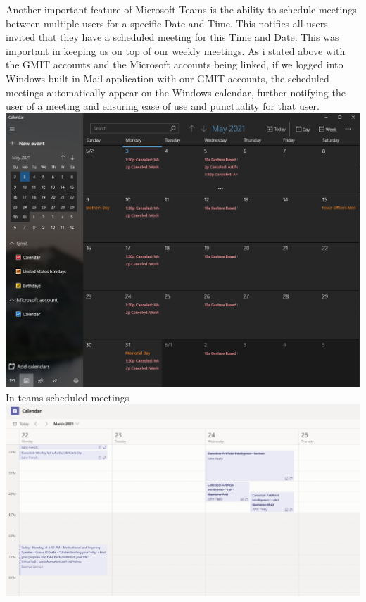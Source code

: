 Another important feature of Microsoft Teams is the ability to schedule meetings between multiple users for a specific Date and Time. This notifies all users invited that they have a scheduled meeting for this Time and Date. This was important in keeping us on top of our weekly meetings. As i stated above with the GMIT accounts and the Microsoft accounts being linked, if we logged into Windows built in Mail application with our GMIT accounts, the scheduled meetings automatically appear on the Windows calendar, further notifying the user of a meeting and ensuring ease of use and punctuality for that user.\newline
\includegraphics[scale=0.4]{img/Caledar.PNG} \newline
In teams scheduled meetings \newline
\includegraphics[scale=0.4]{img/TCalendar.PNG}\newline

